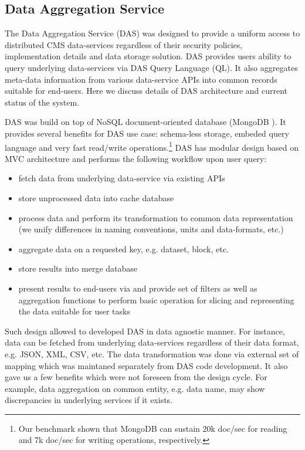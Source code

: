 \subsection{Data Aggregation Service}
The Data Aggregation Service (DAS) \cite{DAS} was designed to provide a uniform
access to distributed CMS data-services regardless of their security policies,
implementation details and data storage solution. DAS provides users ability to
query underlying data-services via DAS Query Language (QL). It also aggregates
meta-data information from various data-service APIs into common records
suitable for end-users. Here we discuss details of DAS architecture and
current status of the system.

DAS was build on top of NoSQL document-oriented database (MongoDB
\cite{MongoDB}). It provides several benefits for DAS use case: schema-less
storage, embeded query language and very fast read/write
operations.\footnote{Our benchmark shown that MongoDB can sustain 20k doc/sec
for reading and 7k doc/sec for writing operations, respectively.}
DAS has modular design based on MVC architecture \cite{MVC} and performs the
following workflow upon user query:

\begin{itemize}
\item fetch data from underlying data-service via existing APIs
\item store unprocessed data into cache database
\item process data and perform its transformation to common data representation
(we unify differences in naming conventions, units and data-formats, etc.)
\item aggregate data on a requested key, e.g. dataset, block, etc.
\item store results into merge database
\item present results to end-users via and provide set of filters as well as
aggregation functions to perform basic operation for slicing and representing
the data suitable for user tasks
\end{itemize}

Such design allowed to developed DAS in data agnostic manner. For instance,
data can be fetched from underlying data-services regardless of their data format, e.g.
JSON, XML, CSV, etc. The data transformation was done via external set of
mapping which was maintaned separately from DAS code development. It also gave
us a few benefits which were not foreseen from the design cycle. For example,
data aggregation on common entity, e.g. data name, may show discrepancies in
underlying services if it exists.

